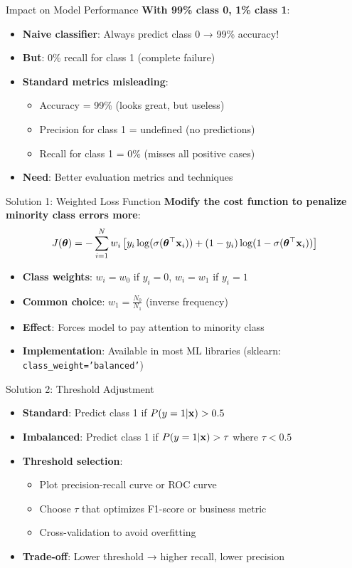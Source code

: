\documentclass{beamer}
\begin{document}
\begin{frame}{Impact on Model Performance}
\textbf{With 99\% class 0, 1\% class 1}:
\begin{itemize}[<+->]
\item \textbf{Naive classifier}: Always predict class 0 → 99\% accuracy!
\item \textbf{But}: 0\% recall for class 1 (complete failure)
\item \textbf{Standard metrics misleading}:
    \begin{itemize}
    \item Accuracy = 99\% (looks great, but useless)
    \item Precision for class 1 = undefined (no predictions)
    \item Recall for class 1 = 0\% (misses all positive cases)
    \end{itemize}
\item \textbf{Need}: Better evaluation metrics and techniques
\end{itemize}
\end{frame}

\begin{frame}{Solution 1: Weighted Loss Function}
\textbf{Modify the cost function to penalize minority class errors more}:
$$J(\boldsymbol{\theta}) = -\sum_{i=1}^{N} w_i \left[y_i \log(\sigma(\boldsymbol{\theta}^\top\mathbf{x}_i)) + (1-y_i)\log(1-\sigma(\boldsymbol{\theta}^\top\mathbf{x}_i))\right]$$

\begin{itemize}[<+->]
\item \textbf{Class weights}: $w_i = w_0$ if $y_i = 0$, $w_i = w_1$ if $y_i = 1$
\item \textbf{Common choice}: $w_1 = \frac{N_0}{N_1}$ (inverse frequency)
\item \textbf{Effect}: Forces model to pay attention to minority class
\item \textbf{Implementation}: Available in most ML libraries (sklearn: \texttt{class\_weight='balanced'})
\end{itemize}
\end{frame}

\begin{frame}{Solution 2: Threshold Adjustment}
\begin{itemize}[<+->]
\item \textbf{Standard}: Predict class 1 if $P(y=1|\mathbf{x}) > 0.5$
\item \textbf{Imbalanced}: Predict class 1 if $P(y=1|\mathbf{x}) > \tau$ where $\tau < 0.5$
\item \textbf{Threshold selection}:
    \begin{itemize}
    \item Plot precision-recall curve or ROC curve
    \item Choose $\tau$ that optimizes F1-score or business metric
    \item Cross-validation to avoid overfitting
    \end{itemize}
\item \textbf{Trade-off}: Lower threshold → higher recall, lower precision
\end{itemize}
\end{frame}
\end{document}
